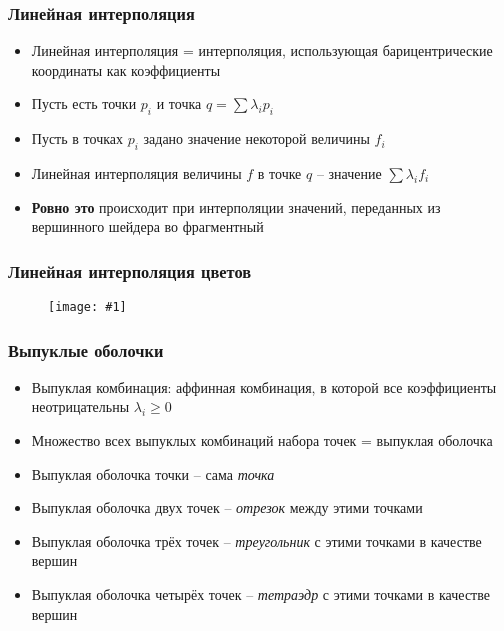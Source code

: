 \documentclass[10pt]{beamer}
\newcommand{\slideimage}[1]{
  \begin{figure}
    \begin{adjustbox}{width=\textwidth, totalheight=\textheight-2\baselineskip-2\baselineskip,keepaspectratio}
      \texttt{[image: \#1]}
    \end{adjustbox}
  \end{figure}
}
\begin{document}
\begin{frame}[fragile]
\frametitle{Линейная интерполяция}
\begin{itemize}
\item Линейная интерполяция = интерполяция, использующая барицентрические координаты как коэффициенты
\pause
\item Пусть есть точки \begin{math}p_i\end{math} и точка \begin{math}q = \sum \lambda_i p_i\end{math}
\pause
\item Пусть в точках \begin{math}p_i\end{math} задано значение некоторой величины \begin{math}f_i\end{math}
\pause
\item Линейная интерполяция величины \begin{math}f\end{math} в точке \begin{math}q\end{math} -- значение \begin{math}\sum \lambda_i f_i\end{math}
\pause
\item \textbf{Ровно это} происходит при интерполяции значений, переданных из вершинного шейдера во фрагментный
\end{itemize}
\end{frame}

\begin{frame}[fragile]
\frametitle{Линейная интерполяция цветов}
\slideimage{triangle.png}
\end{frame}

\begin{frame}[fragile]
\frametitle{Выпуклые оболочки}
\begin{itemize}
\item Выпуклая комбинация: аффинная комбинация, в которой все коэффициенты неотрицательны \begin{math}\lambda_i \geq 0\end{math}
\pause
\item Множество всех выпуклых комбинаций набора точек = выпуклая оболочка
\pause
\item Выпуклая оболочка точки -- сама \textit{точка}
\pause
\item Выпуклая оболочка двух точек -- \textit{отрезок} между этими точками
\pause
\item Выпуклая оболочка трёх точек -- \textit{треугольник} с этими точками в качестве вершин
\pause
\item Выпуклая оболочка четырёх точек -- \textit{тетраэдр} с этими точками в качестве вершин
\end{itemize}
\end{frame}
\end{document}
